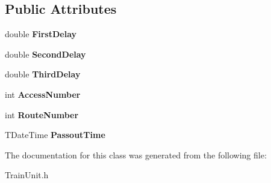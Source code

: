 \subsection*{Public Attributes}
\begin{DoxyCompactItemize}
\item 
\mbox{\label{class_t_train_controller_1_1_t_continuation_auto_sig_entry_ab5a944eed2be17d13d99a9070f78c785}} 
double {\bfseries First\+Delay}
\item 
\mbox{\label{class_t_train_controller_1_1_t_continuation_auto_sig_entry_a637042cd9aa1c141c68ca1979935c8d8}} 
double {\bfseries Second\+Delay}
\item 
\mbox{\label{class_t_train_controller_1_1_t_continuation_auto_sig_entry_ad393d737f9031743cabfc1fbd1ac6239}} 
double {\bfseries Third\+Delay}
\item 
\mbox{\label{class_t_train_controller_1_1_t_continuation_auto_sig_entry_ae4cf92f0e912fe54c7b9549ba4158e90}} 
int {\bfseries Access\+Number}
\item 
\mbox{\label{class_t_train_controller_1_1_t_continuation_auto_sig_entry_a20f64023350c7394250f784b58a5c036}} 
int {\bfseries Route\+Number}
\item 
\mbox{\label{class_t_train_controller_1_1_t_continuation_auto_sig_entry_a658b7d6efd311690bb9c36e3518e3ff5}} 
T\+Date\+Time {\bfseries Passout\+Time}
\end{DoxyCompactItemize}


The documentation for this class was generated from the following file\+:\begin{DoxyCompactItemize}
\item 
Train\+Unit.\+h\end{DoxyCompactItemize}
